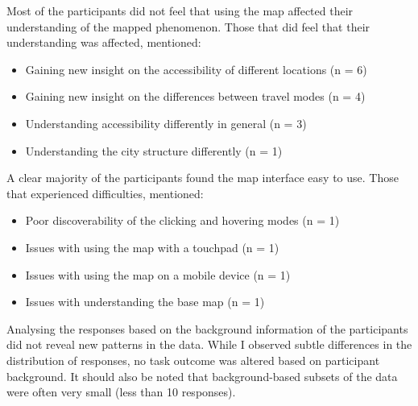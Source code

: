 Most of the participants did not feel that using the map affected
their understanding of the mapped phenomenon.
Those that did feel that their understanding was affected, mentioned:
\begin{itemize}
	\item Gaining new insight on the accessibility of different locations (n = 6)
	\item Gaining new insight on the differences between travel modes (n = 4)
	\item Understanding accessibility differently in general (n = 3)
	\item Understanding the city structure differently (n = 1)
\end{itemize}

A clear majority of the participants found the map interface easy to use.
Those that experienced difficulties, mentioned:
\begin{itemize}
	\item Poor discoverability of the clicking and hovering modes (n = 1)
	\item Issues with using the map with a touchpad (n = 1)
	\item Issues with using the map on a mobile device (n = 1)
	\item Issues with understanding the base map (n = 1)
\end{itemize}

Analysing the responses based on the background information of the participants
did not reveal new patterns in the data.
While I observed subtle differences in the distribution of responses,
no task outcome was altered based on participant background.
It should also be noted that
background-based subsets of the data were often very small (less than 10 responses).
